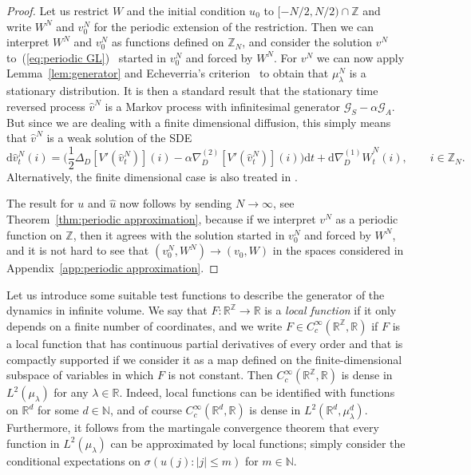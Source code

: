 \documentclass[11pt, a4paper]{article}
\newcommand{\mathd}{\mathrm{d}}
\newcommand{\tmtextit}[1]{{\itshape{#1}}}
\newcommand{\CG}{\mathscr{G}}
\newcommand{\1}{\mathbf{1}}
\begin{document}
\begin{proof}
  Let us restrict $W$ and the initial condition $u_0$ to $[- N / 2, N / 2) \cap
  \mathbb{Z}$ and write $W^N$ and $v^N_0$ for the periodic extension of the
  restriction. Then we can interpret $W^N$ and $v^N_0$ as functions defined on
  $\mathbb{Z}_N$, and consider the solution $v^N$ to~(\ref{eq:periodic GL}) \
  started in $v_0^N$ and forced by $W^N$. For $v^N$ we can now apply
  Lemma~\ref{lem:generator} and Echeverria's criterion~\cite[Theorem 4.9.17]{bib:ethierKurtz}
  to obtain that
  ${\mu}^N_{\lambda}$ is a stationary distribution. It is then a standard
  result that the stationary time reversed process $\hat{v}^N$ is a Markov
  process with infinitesimal generator $\CG_S - \alpha \CG_A$. But since we
  are dealing with a finite dimensional diffusion, this simply means that
  $\hat{v}^N$ is a weak solution of the SDE
  \[ \mathd \hat{v}^N_t (i) = \Big( \frac{1}{2} \Delta_D [V' (\hat{v}^N_t)]
     (i) - \alpha \nabla^{(2)}_D [V' (\hat{v}^N_t)] (i) \Big) \mathd t +
     \mathd \nabla^{(1)}_D \hat{W}^N_t (i), \hspace{2em} i \in \mathbb{Z}_N .
  \]
  Alternatively, the finite dimensional case is also treated in
  \cite[Theorem 2.3]{bib:milletEtAl}.
  
  The result for $u$ and $\hat{u}$ now follows by sending $N \rightarrow \infty$, see
  Theorem~\ref{thm:periodic approximation}, because if we interpret $v^N$ as a
  periodic function on $\mathbb{Z}$, then it agrees with the solution started
  in $v_0^N$ and forced by $W^N$, and it is not hard to see that $(v_0^N, W^N)
  \rightarrow (v_0, W)$ in the spaces considered in Appendix~\ref{app:periodic
  approximation}.
\end{proof}

Let us introduce some suitable test functions to describe the generator of the dynamics in infinite volume. We say that $F \colon \mathbb{R}^{\mathbb{Z}}
\rightarrow \mathbb{R}$ is a \tmtextit{local function} if it only depends on
a finite number of coordinates, and we write $F \in C^{\infty}_c
(\mathbb{R}^{\mathbb{Z}}, \mathbb{R})$ if $F$ is a local function that has
continuous partial derivatives of every order and that is compactly supported
if we consider it as a map defined on the finite-dimensional subspace of
variables in which $F$ is not constant. Then $C^{\infty}_c
(\mathbb{R}^{\mathbb{Z}}, \mathbb{R})$ is dense in $L^2
({\mu}_{\lambda})$ for any $\lambda \in \mathbb{R}$. Indeed, local
functions can be identified with functions on $\mathbb{R}^d$ for some $d \in
\mathbb{N}$, and of course $C^{\infty}_c (\mathbb{R}^d,
\mathbb{R})$ is dense in $L^2 (\mathbb{R}^d, {\mu}_{\lambda}^d)$.
Furthermore, it follows from the martingale convergence theorem that every
function in $L^2 ({\mu}_{\lambda})$ can be approximated by local
functions; simply consider the conditional expectations on $\sigma (u (j) : |
j | \leqslant m)$ for $m \in \mathbb{N}$.
\end{document}
